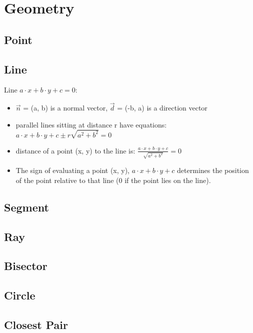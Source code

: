\chapter{ Geometry }

\section{ Point }

\section{ Line }
Line $a \cdot x + b \cdot y + c = 0$:
\begin{itemize}
   \item $\vec{n}$ = (a, b) is a normal vector, $\vec{d}$ = (-b, a) is a direction vector
   \item parallel lines sitting at distance r have equations: $ a \cdot x + b \cdot y +
            c \pm r\sqrt{a^2 + b^2} = 0 $
   \item distance of a point (x, y) to the line is: $ \frac{a \cdot x + b \cdot y +
               c}{\sqrt{a^2 + b^2}} = 0 $
   \item The sign of evaluating a point (x, y), $ a \cdot x + b \cdot y + c $ determines
         the position of the point relative to that line (0 if the point lies on the
         line).
\end{itemize}

\section{ Segment }

\section{ Ray }

\section{ Bisector }

\section{ Circle }

\section{ Closest Pair }

